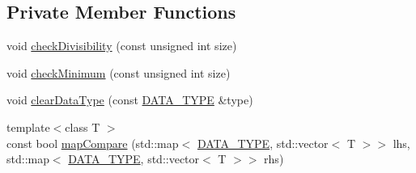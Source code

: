 \subsection*{Private Member Functions}
\begin{DoxyCompactItemize}
\item 
void \hyperlink{class_graphics_1_1_vertex_data_a90ba58b28b6981de0d841dfaff056bd9}{check\+Divisibility} (const unsigned int size)
\item 
void \hyperlink{class_graphics_1_1_vertex_data_a6bbb857b2a231cd75a236adfb553e976}{check\+Minimum} (const unsigned int size)
\item 
void \hyperlink{class_graphics_1_1_vertex_data_ac506af313dd521dfd05c566df3bf41bd}{clear\+Data\+Type} (const \hyperlink{class_graphics_1_1_vertex_data_a50e88236939dc2a3ec4df7aeb728620e}{D\+A\+T\+A\+\_\+\+T\+Y\+P\+E} \&type)
\item 
{\footnotesize template$<$class T $>$ }\\const bool \hyperlink{class_graphics_1_1_vertex_data_abe21332be8f7e42e9655c3271ddef0c0}{map\+Compare} (std\+::map$<$ \hyperlink{class_graphics_1_1_vertex_data_a50e88236939dc2a3ec4df7aeb728620e}{D\+A\+T\+A\+\_\+\+T\+Y\+P\+E}, std\+::vector$<$ T $>$$>$ lhs, std\+::map$<$ \hyperlink{class_graphics_1_1_vertex_data_a50e88236939dc2a3ec4df7aeb728620e}{D\+A\+T\+A\+\_\+\+T\+Y\+P\+E}, std\+::vector$<$ T $>$$>$ rhs)
\end{DoxyCompactItemize}
